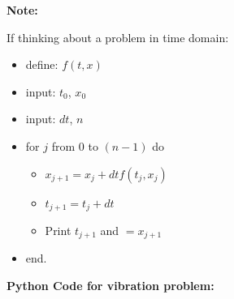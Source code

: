 \begin{bbox}[0.96]
\textbf{Note:}

If thinking about a problem in time domain:

\begin{itemize}
    \item define: $ f(t,x) $

    \item input: $ t_0 $, $ x_0 $

    \item input: $ dt $, $ n $

    \item for $ j $ from $ 0 $ to $ (n-1) $ do
        \begin{itemize}
            \item $ x_{j+1} = x_j + dt f(t_j, x_j) $
            \item $ t_{j+1} = t_j + dt $
            \item Print $ t_{j+1} $ and $= x_{j+1} $
        \end{itemize}
    \item end.
\end{itemize}

\end{bbox}


\newpage
\textbf{Python Code for vibration problem:}


